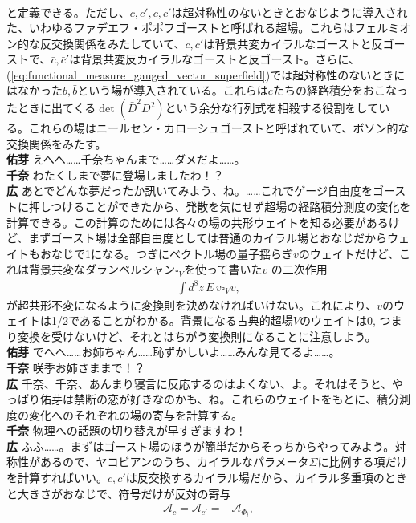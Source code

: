 \documentclass[paper=b5j,fontsize=12Q,jafontsize=12Q,baselineskip=21Q]{jlreq}
\DeclareRobustCommand{\hiron}{\textbf{広 }}
\DeclareRobustCommand{\chinan}{\textbf{千奈 }}
\DeclareRobustCommand{\umen}{\textbf{佑芽 }}
\begin{document}
\begin{refsection}
\begin{align}
\end{align}
と定義できる。ただし、$c,c',\bar c,\bar c'$は超対称性のないときとおなじように導入された、いわゆるファデエフ・ポポフゴーストと呼ばれる超場。これらはフェルミオン的な反交換関係をみたしていて、$c,c'$は背景共変カイラルなゴーストと反ゴーストで、$\bar c,\bar c'$は背景共変反カイラルなゴーストと反ゴースト。さらに、(\ref{eq:functional_measure_gauged_vector_superfield})では超対称性のないときにはなかった$b,\bar b$という場が導入されている。これらは$c$たちの経路積分をおこなったときに出てくる$\det(\bar{D}^2 D^2)$という余分な行列式を相殺する役割をしている。これらの場はニールセン・カローシュゴーストと呼ばれていて、ボソン的な交換関係をみたす。
\\\umen えへへ……千奈ちゃんまで……ダメだよ……。
\\\chinan わたくしまで夢に登場しましたわ！？
\\\hiron あとでどんな夢だったか訊いてみよう、ね。……これでゲージ自由度をゴーストに押しつけることができたから、発散を気にせず超場の経路積分測度の変化を計算できる。この計算のためには各々の場の共形ウェイトを知る必要があるけど、まずゴースト場は全部自由度としては普通のカイラル場とおなじだからウェイトもおなじで1になる。つぎにベクトル場の量子揺らぎ$v$のウェイトだけど、これは背景共変なダランベルシャン$\square_V$を使って書いた$v$ の二次作用
\begin{align}
  \int d^8z \, E \, v \square_V v,
\end{align}
が超共形不変になるように変換則を決めなければいけない。これにより、$v$のウェイトは1/2であることがわかる。背景になる古典的超場$V$のウェイトは0, つまり変換を受けないけど、それとはちがう変換則になることに注意しよう。
\\\umen でへへ……お姉ちゃん……恥ずかしいよ……みんな見てるよ……。
\\\chinan 咲季お姉さままで！？
\\\hiron 千奈、千奈、あんまり寝言に反応するのはよくない、よ。それはそうと、やっぱり佑芽は禁断の恋が好きなのかも、ね。これらのウェイトをもとに、積分測度の変化へのそれぞれの場の寄与を計算する。
\\\chinan 物理への話題の切り替えが早すぎますわ！
\\\hiron ふふ……。まずはゴースト場のほうが簡単だからそっちからやってみよう。対称性があるので、ヤコビアンのうち、カイラルなパラメータ$\Sigma$に比例する項だけを計算すればいい。$c,c'$は反交換するカイラル場だから、カイラル多重項のときと大きさがおなじで、符号だけが反対の寄与
\begin{align}
  \mathcal A_{c}=\mathcal A_{c'}=-\mathcal A_{\Phi_i},
\end{align}

\end{refsection}
\end{document}
